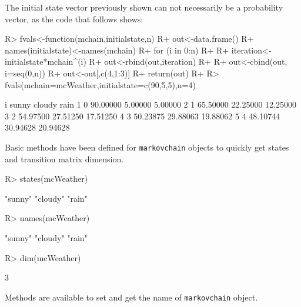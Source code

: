 \documentclass[article,nojss]{jss}
\begin{document}
The initial state vector previously shown can not necessarily be a probability vector, as the code that follows shows:

\begin{CodeChunk}

\begin{CodeInput}
R> fvals<-function(mchain,initialstate,n) {
R+   out<-data.frame()
R+   names(initialstate)<-names(mchain)
R+   for (i in 0:n)
R+   {
R+     iteration<-initialstate*mchain^(i)
R+     out<-rbind(out,iteration)
R+   }
R+   out<-cbind(out, i=seq(0,n))
R+   out<-out[,c(4,1:3)]
R+   return(out)
R+ }
R> fvals(mchain=mcWeather,initialstate=c(90,5,5),n=4)
\end{CodeInput}

\begin{CodeOutput}
  i    sunny   cloudy     rain
1 0 90.00000  5.00000  5.00000
2 1 65.50000 22.25000 12.25000
3 2 54.97500 27.51250 17.51250
4 3 50.23875 29.88063 19.88062
5 4 48.10744 30.94628 20.94628
\end{CodeOutput}
\end{CodeChunk}

Basic methods have been defined for \texttt{markovchain} objects to quickly get states and transition matrix dimension.

\begin{CodeChunk}

\begin{CodeInput}
R> states(mcWeather)
\end{CodeInput}

\begin{CodeOutput}
[1] "sunny"  "cloudy" "rain"  
\end{CodeOutput}

\begin{CodeInput}
R> names(mcWeather)
\end{CodeInput}

\begin{CodeOutput}
[1] "sunny"  "cloudy" "rain"  
\end{CodeOutput}

\begin{CodeInput}
R> dim(mcWeather)
\end{CodeInput}

\begin{CodeOutput}
[1] 3
\end{CodeOutput}
\end{CodeChunk}

Methods are available to set and get the name of \texttt{markovchain} object.
\end{document}
